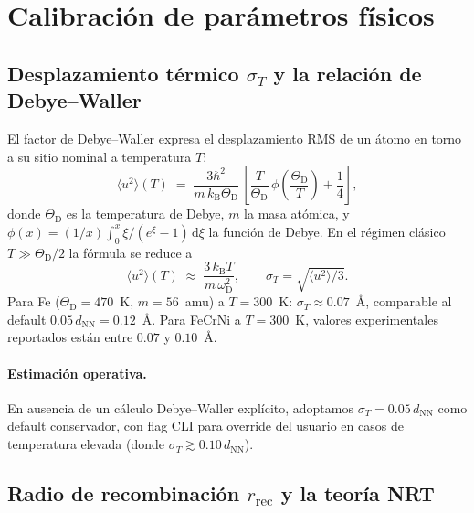 \documentclass[11pt,a4paper]{article}
\theoremstyle{remark}
\begin{document}
\section{Calibración de parámetros físicos}

\subsection{Desplazamiento térmico $\sigma_T$ y la relación de Debye--Waller}

El factor de Debye--Waller \cite{Kittel2004} expresa el desplazamiento
RMS de un átomo en torno a su sitio nominal a temperatura $T$:
\begin{equation}
  \langle u^2 \rangle(T) \;=\;
  \frac{3\hbar^2}{m\,k_\text{B}\Theta_\text{D}}\,
  \left[ \frac{T}{\Theta_\text{D}}\,\phi\!\left(\frac{\Theta_\text{D}}{T}\right)
         + \frac{1}{4}\right],
  \label{eq:debye-waller}
\end{equation}
donde $\Theta_\text{D}$ es la temperatura de Debye, $m$ la masa
atómica, y $\phi(x) = (1/x)\int_0^x \xi/(e^\xi - 1)\,\mathrm{d}\xi$
la función de Debye. En el régimen clásico $T \gg \Theta_\text{D}/2$
la fórmula se reduce a
\begin{equation}
  \langle u^2 \rangle(T) \;\approx\;
  \frac{3\,k_\text{B} T}{m\,\omega_\text{D}^2},
  \qquad \sigma_T = \sqrt{\langle u^2\rangle/3}.
\end{equation}
Para Fe ($\Theta_\text{D} = 470$~K, $m = 56$~amu) a $T = 300$~K:
$\sigma_T \approx 0.07$~Å, comparable al default
$0.05\,d_\text{NN} = 0.12$~Å. Para FeCrNi a $T = 300$~K, valores
experimentales reportados están entre $0.07$ y $0.10$~Å.

\paragraph{Estimación operativa.} En ausencia de un cálculo
Debye--Waller explícito, adoptamos $\sigma_T = 0.05\,d_\text{NN}$ como
default conservador, con flag CLI para override del usuario en casos
de temperatura elevada (donde
$\sigma_T \gtrsim 0.10\,d_\text{NN}$).

\subsection{Radio de recombinación $r_\text{rec}$ y la teoría NRT}
\end{document}

